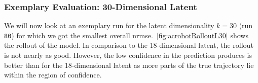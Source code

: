 		\subsubsection{Exemplary Evaluation: 30-Dimensional Latent}
			We will now look at an exemplary run for the latent dimensionality \( k = 30 \) (run \texttt{80}) for which we got the smallest overall \ac{nrmse}.~\autoref{fig:acrobotRolloutL30} shows the rollout of the model. In comparison to the 18-dimensional latent, the rollout is not nearly as good. However, the low confidence in the prediction produces is better than for the 18-dimensional latent as more parts of the true trajectory lie within the region of confidence.
